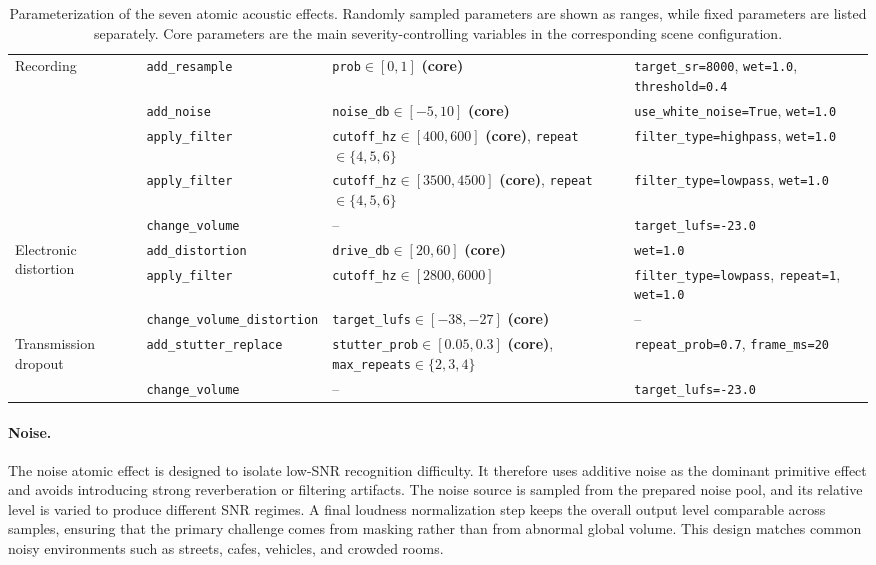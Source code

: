 \documentclass{llmxive}
\begin{document}
\begin{table}[t]
\begin{tabular}{p{} p{} p{} p{}}
\midrule
\multirow{5}{*}{Recording}
& \texttt{add\_resample}
& \texttt{prob}$\in[0,1]$ \textbf{(core)}
& \texttt{target\_sr=8000}, \texttt{wet=1.0}, \texttt{threshold=0.4} \\
& \texttt{add\_noise}
& \texttt{noise\_db}$\in[-5,10]$ \textbf{(core)}
& \texttt{use\_white\_noise=True}, \texttt{wet=1.0} \\
& \texttt{apply\_filter}
& \texttt{cutoff\_hz}$\in[400,600]$ \textbf{(core)}, \texttt{repeat}$\in\{4,5,6\}$
& \texttt{filter\_type=highpass}, \texttt{wet=1.0} \\
& \texttt{apply\_filter}
& \texttt{cutoff\_hz}$\in[3500,4500]$ \textbf{(core)}, \texttt{repeat}$\in\{4,5,6\}$
& \texttt{filter\_type=lowpass}, \texttt{wet=1.0} \\
& \texttt{change\_volume}
& --
& \texttt{target\_lufs=-23.0} \\

\midrule
\multirow{3}{*}{Electronic distortion}
& \texttt{add\_distortion}
& \texttt{drive\_db}$\in[20,60]$ \textbf{(core)}
& \texttt{wet=1.0} \\
& \texttt{apply\_filter}
& \texttt{cutoff\_hz}$\in[2800,6000]$
& \texttt{filter\_type=lowpass}, \texttt{repeat=1}, \texttt{wet=1.0} \\
& \texttt{change\_volume\_distortion}
& \texttt{target\_lufs}$\in[-38,-27]$ \textbf{(core)}
& -- \\

\midrule
\multirow{2}{*}{Transmission dropout}
& \texttt{add\_stutter\_replace}
& \texttt{stutter\_prob}$\in[0.05,0.3]$ \textbf{(core)}, \texttt{max\_repeats}$\in\{2,3,4\}$
& \texttt{repeat\_prob=0.7}, \texttt{frame\_ms=20} \\
& \texttt{change\_volume}
& --
& \texttt{target\_lufs=-23.0} \\

\bottomrule
\end{tabular}
\caption{Parameterization of the seven atomic acoustic effects. Randomly sampled parameters are shown as ranges, while fixed parameters are listed separately. Core parameters are the main severity-controlling variables in the corresponding scene configuration.}
\label{tab:atomic_effect_parameters}
\end{table}

\paragraph{Noise.}
The noise atomic effect is designed to isolate low-SNR recognition difficulty.
It therefore uses additive noise as the dominant primitive effect and avoids
introducing strong reverberation or filtering artifacts. The noise source is
sampled from the prepared noise pool, and its relative level is varied to
produce different SNR regimes. A final loudness normalization step keeps the
overall output level comparable across samples, ensuring that the primary
challenge comes from masking rather than from abnormal global volume. This
design matches common noisy environments such as streets, cafes, vehicles, and
crowded rooms.
\end{document}
